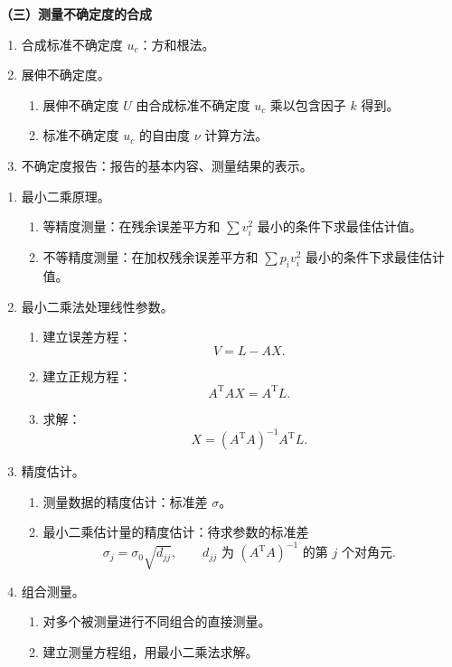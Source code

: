 \documentclass[a4paper,zihao=-4]{ctexart}
\newcommand{\chap}[1]{\vspace{0.5em}{\centering\zihao{-4}\bfseries #1\par}\vspace{0.18em}}
\newcommand{\subtopic}[1]{\vspace{0.5em}\textbf{#1}\par}
\begin{document}
\subtopic{（三）测量不确定度的合成}
\begin{enumerate}[label=\arabic*、]
    \item 合成标准不确定度 $u_c$：方和根法。
    \item 展伸不确定度。
    \begin{enumerate}[label=（\arabic*）]
        \item 展伸不确定度 $U$ 由合成标准不确定度 $u_c$ 乘以包含因子 $k$ 得到。
        \item 标准不确定度 $u_c$ 的自由度 $\nu$ 计算方法。
    \end{enumerate}
    \item 不确定度报告：报告的基本内容、测量结果的表示。
\end{enumerate}

\chap{第五章\quad 最小二乘法}
\begin{enumerate}[label=\arabic*、]
    \item 最小二乘原理。
    \begin{enumerate}[label=（\arabic*）]
        \item 等精度测量：在残余误差平方和 $\sum v_i^2$ 最小的条件下求最佳估计值。
        \item 不等精度测量：在加权残余误差平方和 $\sum p_i v_i^2$ 最小的条件下求最佳估计值。
    \end{enumerate}
    \item 最小二乘法处理线性参数。
    \begin{enumerate}[label=（\arabic*）]
        \item 建立误差方程：
        \begin{equation*}
            V=L-AX .
        \end{equation*}
        \item 建立正规方程：
        \begin{equation*}
            A^{\mathrm T}AX=A^{\mathrm T}L .
        \end{equation*}
        \item 求解：
        \begin{equation*}
            X=(A^{\mathrm T}A)^{-1}A^{\mathrm T}L .
        \end{equation*}
    \end{enumerate}
    \item 精度估计。
    \begin{enumerate}[label=（\arabic*）]
        \item 测量数据的精度估计：标准差 $\sigma$。
        \item 最小二乘估计量的精度估计：待求参数的标准差
        \begin{equation*}
            \sigma_j=\sigma_0\sqrt{d_{jj}},\qquad d_{jj}\text{ 为 }(A^{\mathrm T}A)^{-1}\text{ 的第 }j\text{ 个对角元} .
        \end{equation*}
    \end{enumerate}
    \item 组合测量。
    \begin{enumerate}[label=（\arabic*）]
        \item 对多个被测量进行不同组合的直接测量。
        \item 建立测量方程组，用最小二乘法求解。
    \end{enumerate}
\end{enumerate}
\end{document}
